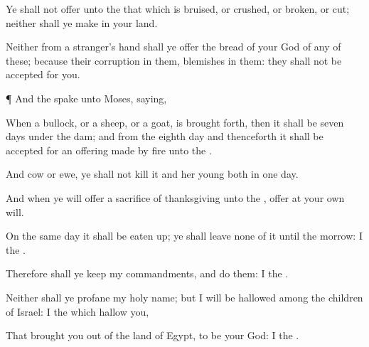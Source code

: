 {Ye shall not
offer unto the
{} that which is
bruised, or
crushed, or
broken, or
cut; neither shall ye
make
{} in your
land.

Neither from a
stranger’s
hand shall ye
offer the
bread of your
God of any of these; because their
corruption
{} in them,
{}
blemishes
{} in them: they shall not be
accepted for you.


\par }{\PP {}¶ And the
{}
spake unto
Moses,
saying,

When a
bullock, or a
sheep, or a
goat, is brought
forth, then it shall be
seven
days under the
dam; and from the
eighth
day and
thenceforth it shall be
accepted for an
offering made by
fire unto the
{}.

And
{}
cow or
ewe, ye shall not
kill it and her
young both in
one
day.

And when ye will
offer a
sacrifice of
thanksgiving unto the
{},
offer
{} at your own
will.

On the same
day it shall be eaten
up; ye shall
leave none of it until the
morrow: I
{} the
{}.

Therefore shall ye
keep my
commandments, and
do them: I
{} the
{}.

Neither shall ye
profane my
holy
name; but I will be
hallowed
among the
children of
Israel: I
{} the
{} which
hallow you,

That brought you
out of the
land of
Egypt, to be your
God: I
{} the
{}.




\par }
